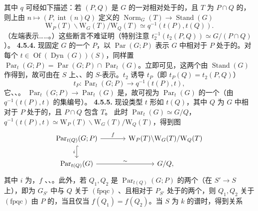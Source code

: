 其中 $q$ 可经如下描述：若 $(P,Q)$ 是 $G$ 的一对相对处于的，且 $T$ 为 $P\cap Q$ 的，则上由 $n\mapsto(P,\operatorname{int}(n)Q)$ 定义的 $\operatorname{Norm}_G(T)\to\operatorname{Stand}(G)$ 
\[\mathrm W_P(T)\backslash\mathrm W_G(T)/\mathrm W_Q(T)\simeq q^{-1}(t(P),t(Q)).\]
（左端表示……。）这些断言不难证明（特别注意 $t_2^{-1}(t_2(P,Q))\simeq G/(P\cap Q)$）。
\textbf{4.5.4.} 现固定 $G$ 的一个 $P$，以 $\operatorname{Par}(G;P)$ 表示 $G$ 中相对于 $P$ 处于的。对每个 $t\in\operatorname{Of}(\operatorname{Dyn}(G))(S)$，同样置 $\operatorname{Par}_t(G;P)=\operatorname{Par}(G;P)\cap\operatorname{Par}_t(G)$。立即可见，这两个由 $\operatorname{Stand}(G)$ 作得到，故可由在 $S$ 上、、的 $S$-表示。$t_2$ 诱导 $t_P$（即 $t_P(Q)=t_2(P,Q)$）
\[t_P:\operatorname{Par}_t(G;P)\longrightarrow q^{-1}(t(P),t),\]
它、、。 $\operatorname{Par}_t(G;P)\to\operatorname{Par}_t(G)$ 是，故可视为 $\operatorname{Par}_t(G)$ 的一个（由 $q^{-1}(t(P),t)$ 的集编号）。
\textbf{4.5.5.} 现设类型 $t$ 形如 $t(Q)$，其中 $Q$ 为 $G$ 中相对于 $P$ 处于的，且 $P\cap Q$ 包含 $T$。
此时 $\operatorname{Par}_t(G)\simeq G/Q$，$q^{-1}(t(P),t)\simeq\mathrm W_P(T)\backslash\mathrm W_G(T)/\mathrm W_Q(T)$，得到图
\[\begin{tikzcd}[column sep=large]
\operatorname{Par}_{t(Q)}(G;P)\arrow[r,"f"]\arrow[d,hook,"i"']&\mathrm W_P(T)\backslash\mathrm W_G(T)/\mathrm W_Q(T)\\
\operatorname{Par}_{t(Q)}(G)\arrow[r,"\sim"]&G/Q,
\end{tikzcd}\]
其中 $i$ 为，$f$ 、、。此外，若 $Q_1,Q_2$ 是 $\operatorname{Par}_{t(Q)}(G;P)$ 的两个（在 $S'\to S$ 上），即为 $G_{S'}$ 中与 $Q$ 关于 $(\mathrm{fpqc})$ 、且相对于 $P_{S'}$ 处于的两个，则 $Q_1,Q_2$ 关于 $(\mathrm{fpqc})$ 由 $P$ 的，当且仅当 $f(Q_1)=f(Q_2)$。当 $S$ 为 $k$ 的谱时，得到关系
